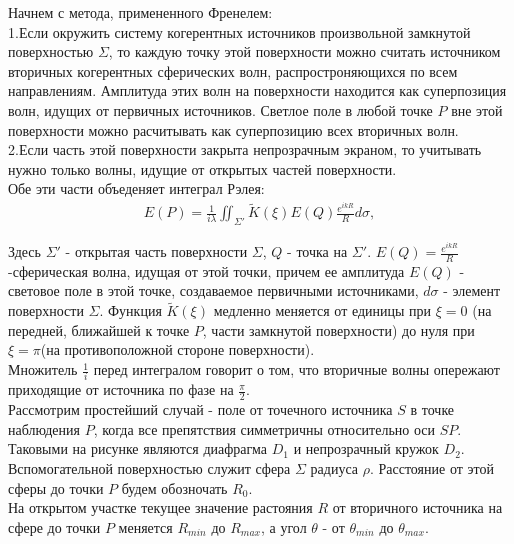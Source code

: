\documentclass[__main__.tex]{subfiles}
\begin{document}
Начнем с метода, примененного Френелем:\\

1.Если окружить систему когерентных источников произвольной замкнутой поверхностью $\Sigma$, то каждую точку этой поверхности можно считать источником вторичных когерентных сферических волн, распростроняющихся по всем направлениям. Амплитуда этих волн на поверхности находится как суперпозиция волн, идущих от первичных источников. Светлое поле в любой точке $P$ вне этой поверхности можно расчитывать как суперпозицию всех вторичных волн.\\

2.Если часть этой поверхности закрыта непрозрачным экраном, то учитывать нужно только волны, идущие от открытых частей поверхности.\\

Обе эти части объеденяет интеграл Рэлея:
\begin{gather}
	E(P)= \frac{1}{i\lambda}\iint_{\Sigma'} \tilde{K}(\xi)E(Q)\frac{e^{ikR}}{R}d\sigma ,
\end{gather}

Здесь $\Sigma'$ - открытая часть поверхности $\Sigma$, $Q$ - точка на $\Sigma'$. $E(Q)=\frac{e^{ikR}}{R}$ -сферическая волна, идущая от этой точки, причем ее амплитуда $E(Q)$ - световое поле в этой точке, создаваемое первичными источниками, $d\sigma$ - элемент поверхности $\Sigma$. Функция $\tilde{K}(\xi)$ медленно меняется от единицы при $\xi = 0$ (на передней, ближайшей к точке $P$, части замкнутой поверхности) до нуля при $\xi = \pi$(на противоположной стороне поверхности).\\

Множитель $\frac{1}{i} $ перед интегралом говорит о том, что вторичные волны опережают приходящие от источника по фазе на $\frac{\pi}{2}$.\\

Рассмотрим простейший случай - поле от точечного источника $S$ в точке наблюдения $P$, когда все препятствия симметричны относительно оси $SP$. Таковыми на рисунке являются диафрагма $D_1$ и непрозрачный кружок $D_2$. Вспомогательной поверхностью служит сфера $\Sigma$ радиуса $\rho$. Расстояние от этой сферы до точки $P$ будем обозночать $R_0$.\\

На открытом участке текущее значение растояния $R$ от вторичного источника на сфере до точки $P$ меняется $R_{min}$ до $R_{max}$, а угол $\theta$ - от $\theta_{min}$ до $\theta_{max}$.\\
\end{document}
